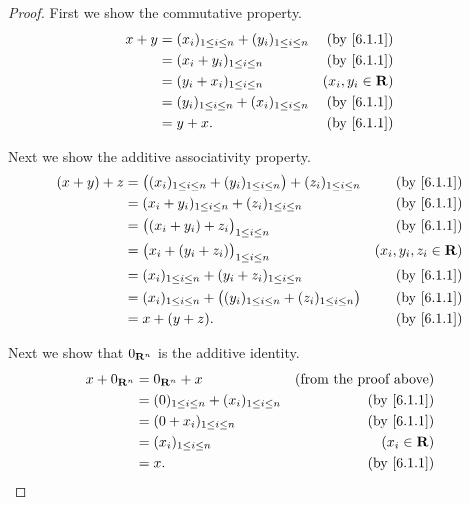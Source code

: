 \begin{proof}
  First we show the commutative property.
  \begin{align*}
    x + y & = (x_i)_{1 \leq i \leq n} + (y_i)_{1 \leq i \leq n} & \text{(by \cref{6.1.1})} \\
          & = (x_i + y_i)_{1 \leq i \leq n}                     & \text{(by \cref{6.1.1})} \\
          & = (y_i + x_i)_{1 \leq i \leq n}                     & (x_i, y_i \in \R)        \\
          & = (y_i)_{1 \leq i \leq n} + (x_i)_{1 \leq i \leq n} & \text{(by \cref{6.1.1})} \\
          & = y + x.                                            & \text{(by \cref{6.1.1})}
  \end{align*}

  Next we show the additive associativity property.
  \begin{align*}
    (x + y) + z & = \big((x_i)_{1 \leq i \leq n} + (y_i)_{1 \leq i \leq n}\big) + (z_i)_{1 \leq i \leq n} & \text{(by \cref{6.1.1})} \\
                & = (x_i + y_i)_{1 \leq i \leq n} + (z_i)_{1 \leq i \leq n}                               & \text{(by \cref{6.1.1})} \\
                & = \big((x_i + y_i) + z_i\big)_{1 \leq i \leq n}                                         & \text{(by \cref{6.1.1})} \\
                & = \big(x_i + (y_i + z_i)\big)_{1 \leq i \leq n}                                         & (x_i, y_i, z_i \in \R)   \\
                & = (x_i)_{1 \leq i \leq n} + (y_i + z_i)_{1 \leq i \leq n}                               & \text{(by \cref{6.1.1})} \\
                & = (x_i)_{1 \leq i \leq n} + \big((y_i)_{1 \leq i \leq n} + (z_i)_{1 \leq i \leq n}\big) & \text{(by \cref{6.1.1})} \\
                & = x + (y + z).                                                                          & \text{(by \cref{6.1.1})}
  \end{align*}

  Next we show that \(0_{\mathbf{R}^n}\) is the additive identity.
  \begin{align*}
    x + 0_{\R^n} & = 0_{\R^n} + x                                    & \text{(from the proof above)} \\
                 & = (0)_{1 \leq i \leq n} + (x_i)_{1 \leq i \leq n} & \text{(by \cref{6.1.1})}      \\
                 & = (0 + x_i)_{1 \leq i \leq n}                     & \text{(by \cref{6.1.1})}      \\
                 & = (x_i)_{1 \leq i \leq n}                         & (x_i \in \R)                  \\
                 & = x.                                              & \text{(by \cref{6.1.1})}
  \end{align*}


\end{proof}
